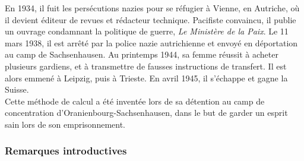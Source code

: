 \documentclass[a4paper, twoside]{article}
\begin{document}
			En 1934, il fuit les persécutions nazies pour se réfugier à Vienne, en Autriche, 
			où il devient éditeur de revues et rédacteur technique. 
			Pacifiste convaincu, il publie un ouvrage condamnant la politique de guerre, 
			\textit{Le Ministère de la Paix}. Le 11 mars 1938, 
			il est arrêté par la police nazie autrichienne et envoyé en déportation 
			au camp de Sachsenhausen. Au printemps 1944, 
			sa femme réussit à acheter plusieurs gardiens, 
			et à transmettre de fausses instructions de transfert. 
			Il est alors emmené à Leipzig, puis à Trieste. En avril 1945, 
			il s'échappe et gagne la Suisse.\\

			Cette méthode de calcul a été inventée lors de sa détention au 
			camp de concentration d'Oranienbourg-Sachsenhausen, 
			dans le but de garder un esprit sain lors de son emprisonnement.

		\vfill

		\subsubsection*{Remarques introductives}
\end{document}
